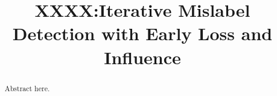 \documentclass[sigconf, anonymous]{acmart}
\begin{document}
\title{XXXX:Iterative Mislabel Detection with Early Loss and Influence}

\renewcommand{\shortauthors}{Trovato et al.}

\begin{abstract}
Abstract here.
\end{abstract}

\maketitle











\normalem


\end{document}
